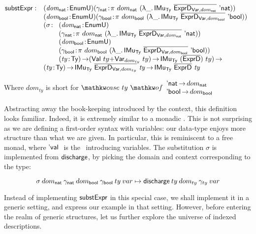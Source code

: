 \[
\begin{array}{@{}ll}
\substH  : & \PITEL{\V{\domNat}}{\EnumU} 
             \PITEL{\V{\gammaNat}}{\spi{\domNat}{(\LAM{\_} \IMu{\Ty}{\toIDesc{\HExprVarD{\domNat}}}{\Enat})}} \\
           & \PITEL{\V{\domBool}}{\EnumU} 
             \PITEL{\V{\gammaBool}}{\spi{\domBool}{(\LAM{\_} \IMu{\Ty}{\toIDesc{\HExprVarD{\domBool}}}{\Ebool})}} \\
          &  \begin{array}{@{}ll}
             \PI{\V{\sigma}}{& \PITEL{\V{\domNat}}{\EnumU} \\
                             & \PITEL{\V{\gammaNat}}
                                     {\spi{\domNat}{(\LAM{\_} \IMu{\Ty}{\toIDesc{\HExprVarD{\domNat}}}{\Enat})}} \\
                             & \PITEL{\V{\domBool}}{\EnumU} \\
                             & \PITEL{\V{\gammaBool}}
                                     {\spi{\domBool}{(\LAM{\_} \IMu{\Ty}{\toIDesc{\HExprVarD{\domBool}}}{\Ebool})}} \\
                             & \PI{\V{ty}}{\Ty} (\SUM{\Val{ty}}{\Var{dom_{ty}}{ty}}) \To
                               \IMu{\Ty}{(\toIDesc{\HExprD})}{ty}}
             \end{array}\\
          & \PI{\V{ty}}{\Ty}
            \IMu{\Ty}{\toIDesc{\HExprVarD{dom_{ty}}}}{\V{ty}} \To
            \IMu{\Ty}{\toIDesc{\HExprD}}{\V{ty}}
\end{array}
\]

Where $dom_{ty}$ is short for
 $\case{ty}{\Enat  \To \domNat
         \\ \Ebool \To \domBool}$

Abstracting away the book-keeping introduced by the context, this
definition looks familiar. Indeed, it is extremely similar to a
monadic \bind. This is not surprising as we are defining a first-order
syntax with variables: our data-type enjoys more structure than what
we are given. In particular, this is reminiscent to a free monad,
where $\Eval{}$ is the \return\ introducing variables. The substitution
$\sigma$ is implemented from $\discharge$, by picking the domain and
context corresponding to the type:

\[
\sigma\: \domNat\: \gammaNat\: \domBool\: \gammaBool\: ty\: var \mapsto 
    \discharge\: ty\: dom_{ty}\: \gamma_{ty}\: var 
\]

Instead of implementing $\substH$ in this special case, we shall
implement it in a generic setting, and express our example in that
setting. However, before entering the realm of generic structures, let
us further explore the universe of indexed descriptions.

